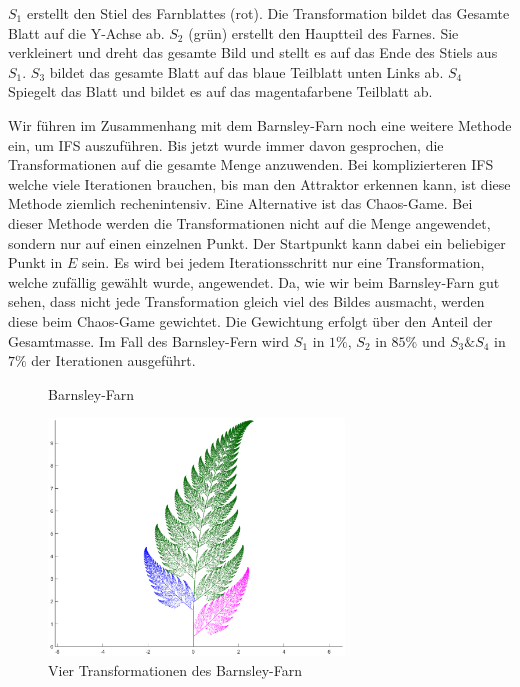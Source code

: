 $S_1$ erstellt den Stiel des Farnblattes (rot).
Die Transformation bildet das Gesamte Blatt auf die Y-Achse ab.
$S_2$ (grün) erstellt den Hauptteil des Farnes. 
Sie verkleinert und dreht das gesamte Bild und stellt es auf das Ende des Stiels aus $S_1$.
$S_3$ bildet das gesamte Blatt auf das blaue Teilblatt unten Links ab.
$S_4$ Spiegelt das Blatt und bildet es auf das magentafarbene Teilblatt ab.  

Wir führen im Zusammenhang mit dem Barnsley-Farn noch eine weitere Methode ein, um IFS auszuführen.
Bis jetzt wurde immer davon gesprochen, die Transformationen auf die gesamte Menge anzuwenden.
Bei komplizierteren IFS welche viele Iterationen brauchen, bis man den Attraktor erkennen kann, ist diese Methode ziemlich rechenintensiv.
Eine Alternative ist das Chaos-Game. 
Bei dieser Methode werden die Transformationen nicht auf die Menge angewendet, sondern nur auf einen einzelnen Punkt.
Der Startpunkt kann dabei ein beliebiger Punkt in $E$ sein.
Es wird bei jedem Iterationsschritt nur eine Transformation, welche zufällig gewählt wurde, angewendet.
Da, wie wir beim Barnsley-Farn gut sehen, dass nicht jede Transformation gleich viel des Bildes ausmacht, werden diese beim Chaos-Game gewichtet.
Die Gewichtung erfolgt über den Anteil der Gesamtmasse.
Im Fall des Barnsley-Fern wird $S_1$ in $1\%$, $S_2$ in $85\%$ und $S_3 \& S_4$ in $7\%$ der Iterationen ausgeführt. 
\begin{figure}
	\label{ifs:farn}
	\centering
	\caption{Barnsley-Farn}
\end{figure}
\begin{figure}
	\label{ifs:farncolor}
	\centering
	\includegraphics[width=0.7\textwidth]{papers/ifs/images/farncolor}
	\caption{Vier Transformationen des Barnsley-Farn}
\end{figure}
